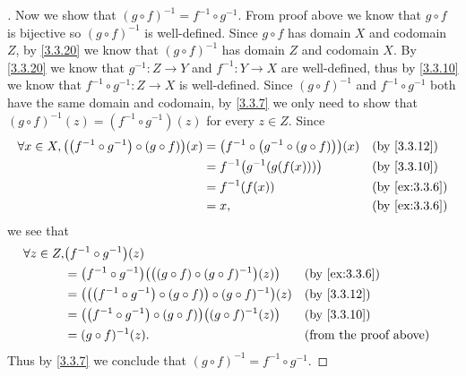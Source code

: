 \begin{proof}[]
  Now we show that \((g \circ f)^{-1} = f^{-1} \circ g^{-1}\).
  From proof above we know that \(g \circ f\) is bijective so \((g \circ f)^{-1}\) is well-defined.
  Since \(g \circ f\) has domain \(X\) and codomain \(Z\), by \cref{3.3.20} we know that \((g \circ f)^{-1}\) has domain \(Z\) and codomain \(X\).
  By \cref{3.3.20} we know that \(g^{-1} : Z \to Y\) and \(f^{-1} : Y \to X\) are well-defined, thus by \cref{3.3.10} we know that \(f^{-1} \circ g^{-1} : Z \to X\) is well-defined.
  Since \((g \circ f)^{-1}\) and \(f^{-1} \circ g^{-1}\) both have the same domain and codomain, by \cref{3.3.7} we only need to show that \((g \circ f)^{-1}(z) = (f^{-1} \circ g^{-1})(z)\) for every \(z \in Z\).
  Since
  \begin{align*}
    \forall x \in X, \pa{\pa{f^{-1} \circ g^{-1}} \circ (g \circ f)}(x) & = \pa{f^{-1} \circ \pa{g^{-1} \circ \pa{g \circ f}}}(x) &  & \by{3.3.12}   \\
                                                                        & = f^{-1}\pa{g^{-1}\pa{g(f(x))}}                         &  & \by{3.3.10}   \\
                                                                        & = f^{-1}(f(x))                                          &  & \by{ex:3.3.6} \\
                                                                        & = x,                                                    &  & \by{ex:3.3.6}
  \end{align*}
  we see that
  \begin{align*}
    \forall z \in Z, & \pa{f^{-1} \circ g^{-1}}(z)                                                                                         \\
                     & = \pa{f^{-1} \circ g^{-1}}\pa{\pa{(g \circ f) \circ (g \circ f)^{-1}}(z)}        &  & \by{ex:3.3.6}                 \\
                     & = \pa{\pa{\pa{f^{-1} \circ g^{-1}} \circ (g \circ f)} \circ (g \circ f)^{-1}}(z) &  & \by{3.3.12}                   \\
                     & = \pa{\pa{f^{-1} \circ g^{-1}} \circ (g \circ f)}\pa{(g \circ f)^{-1}(z)}        &  & \by{3.3.10}                   \\
                     & = (g \circ f)^{-1}(z).                                                           &  & \text{(from the proof above)}
  \end{align*}
  Thus by \cref{3.3.7} we conclude that \((g \circ f)^{-1} = f^{-1} \circ g^{-1}\).
\end{proof}

